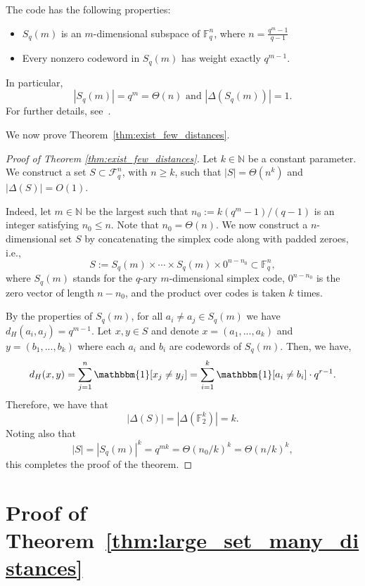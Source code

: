 \documentclass{article}
\theoremstyle{definition}
\begin{document}
The code has the following properties:
\begin{itemize}
    \item $S_q(m)$ is an $m$-dimensional subspace of $\mathbb{F}_q^n$, where $n=\frac{q^m-1}{q-1}$
    \item Every nonzero codeword in $S_q(m)$ has weight exactly $q^{m-1}$.
\end{itemize}
In particular,
\begin{equation}
\text{$|S_q(m)|=q^m=\Theta(n)$ and $|\Delta(S_q(m))|=1$.}
\end{equation}
For further details, see~\cite[Theorems 1.8.3, 2.7.5]{huffman2010fundamentals}.





We now prove Theorem~\ref{thm:exist_few_distances}.
\begin{proof}[Proof of Theorem \ref{thm:exist_few_distances}]
  Let $k\in \mathbb{N}$ be a constant parameter.
  We construct a set $S\subset\mathcal{F}_q^n$, with $n\geq k$, such that 
  $|S|=\Theta(n^k)$ and
  $|\Delta(S)|=O(1)$.

  Indeed,
let $m\in\mathbb{N}$ be the largest such that $n_0:=k(q^m-1)/(q-1)$ is an integer satisfying $n_0 \le n$.  Note that $n_0=\Theta(n)$. We now construct a $n$-dimensional set $S$ by concatenating the simplex code along with padded zeroes, i.e., 
  $$
  S:=S_q(m)\times\cdots\times S_q(m)\times 0^{n-n_0}\subset\mathbb{F}_q^{n},$$
  where $S_q(m)$ stands for the $q$-ary $m$-dimensional simplex code, $0^{n-n_0}$ is the zero vector of length $n-n_0$, and the product over codes is taken $k$ times.

By the properties of $S_q(m)$, for all $a_i \neq a_j \in S_q(m)$ we have $d_H(a_i,a_j) = q^{m-1}$. Let $x,y \in S$ and denote $x = (a_1,...,a_k)$ and $y = (b_1,...,b_k)$ where each $a_i$ and $b_i$ are codewords of $S_q(m)$. Then, we have, 
    $$
    d_H(x,y) = \sum_{j=1}^{n} \mathbbm{1}[x_j \neq y_j] = \sum_{i=1}^{k} \mathbbm{1}[a_i \neq b_i] \cdot q^{r-1}.
    $$
    Therefore, we have that 
    $$|\Delta(S)| = |\Delta(\mathbb{F}_2^{k})| =k.$$
Noting also that $$
|S|=|S_q(m)|^k
=q^{mk}=\Theta({n_0}/k)^k=\Theta(n/k)^k,$$
  this completes the proof of the theorem.
\end{proof}


\section{Proof of Theorem~\ref{thm:large_set_many_distances}}\label{sec:manydistances}
\end{document}
